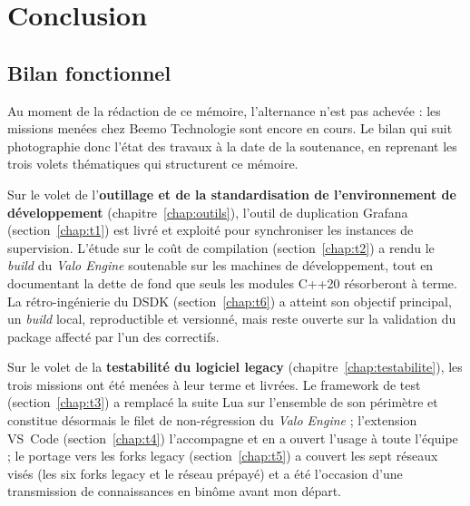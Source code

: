 \chapter{Conclusion}
\label{chap:conclusion}


\section{Bilan fonctionnel}
Au moment de la rédaction de ce mémoire, l'alternance n'est pas achevée :
les missions menées chez Beemo Technologie sont encore en cours. Le bilan
qui suit photographie donc l'état des travaux à la date de la soutenance,
en reprenant les trois volets thématiques qui structurent ce mémoire.

Sur le volet de l'\textbf{outillage et de la standardisation de
l'environnement de développement} (chapitre~\ref{chap:outils}), l'outil de
duplication Grafana (section~\ref{chap:t1}) est livré et exploité pour
synchroniser les instances de supervision. L'étude sur le coût de
compilation (section~\ref{chap:t2}) a rendu le \emph{build} du \emph{Valo
Engine} soutenable sur les machines de développement, tout en documentant la
dette de fond que seuls les modules C++20 résorberont à terme. La
rétro-ingénierie du DSDK (section~\ref{chap:t6}) a atteint son objectif
principal, un \emph{build} local, reproductible et versionné, mais reste
ouverte sur la validation du package affecté par l'un des correctifs.

Sur le volet de la \textbf{testabilité du logiciel legacy}
(chapitre~\ref{chap:testabilite}), les trois missions ont été menées à leur
terme et livrées. Le framework de test (section~\ref{chap:t3}) a remplacé la
suite Lua sur l'ensemble de son périmètre et constitue désormais le filet de
non-régression du \emph{Valo Engine} ; l'extension VS~Code
(section~\ref{chap:t4}) l'accompagne et en a ouvert l'usage à toute
l'équipe ; le portage vers les forks legacy (section~\ref{chap:t5}) a
couvert les sept réseaux visés (les six forks legacy et le réseau prépayé) et a
été l'occasion d'une transmission de connaissances en binôme avant mon départ.

